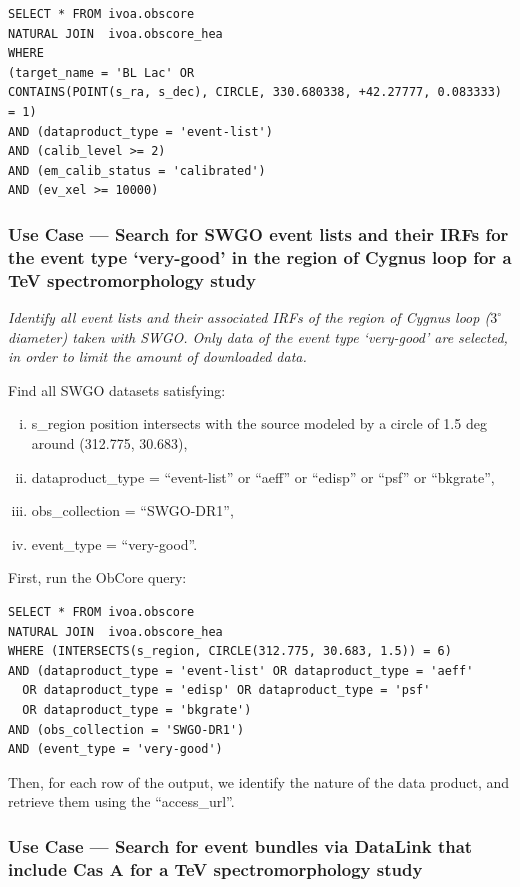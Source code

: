 \begin{verbatim}
SELECT * FROM ivoa.obscore
NATURAL JOIN  ivoa.obscore_hea
WHERE
(target_name = 'BL Lac' OR
CONTAINS(POINT(s_ra, s_dec), CIRCLE, 330.680338, +42.27777, 0.083333) = 1)
AND (dataproduct_type = 'event-list')
AND (calib_level >= 2)
AND (em_calib_status = 'calibrated')
AND (ev_xel >= 10000)
\end{verbatim}


\subsubsection{Use Case ---  Search for SWGO event lists and their \glspl{IRF} for the event type `very-good' in the region of Cygnus loop for a TeV spectromorphology study}

{\em Identify all event lists and their associated \glspl{IRF} of the region of Cygnus loop ($3^{\circ}$ diameter) taken with SWGO. Only data of the event type `very-good' are selected, in order to limit the amount of downloaded data.\/}

\medskip
\noindent Find all SWGO datasets satisfying:
\begin{enumerate}[(i)]
  \item s\_region position intersects with the source modeled by a circle of 1.5 deg around (312.775, 30.683),
  \item dataproduct\_type = ``event-list'' or ``aeff'' or ``edisp'' or ``psf'' or ``bkgrate'',
  \item obs\_collection = ``SWGO-DR1'',
  \item event\_type = ``very-good''.
\end{enumerate}

First, run the ObCore query:
\begin{verbatim}
SELECT * FROM ivoa.obscore
NATURAL JOIN  ivoa.obscore_hea
WHERE (INTERSECTS(s_region, CIRCLE(312.775, 30.683, 1.5)) = 6)
AND (dataproduct_type = 'event-list' OR dataproduct_type = 'aeff'
  OR dataproduct_type = 'edisp' OR dataproduct_type = 'psf'
  OR dataproduct_type = 'bkgrate')
AND (obs_collection = 'SWGO-DR1')
AND (event_type = 'very-good')
\end{verbatim}

Then, for each row of the output, we identify the nature of the data product, and retrieve them using the ``access\_url''.

\subsubsection{Use Case --- Search for event bundles via DataLink that include Cas A for a TeV spectromorphology study}

